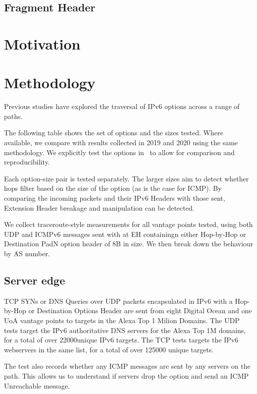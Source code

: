 \documentclass[conference]{IEEEtran}
\begin{document}
\subsection{Fragment Header}


\section{Motivation}
\label{sec:motivation}


\section{Methodology} 
\label{sec:methodology}

Previous studies have explored the traversal of IPv6 options across a range of paths.

The following table shows the set of options and the sizes tested. Where available, we
compare with results collected in 2019 and 2020 using the same methodology.
We explicitly test the options in~\cite{james} to allow for comparison and reproducibility.




Each option-size pair is tested separately.  The larger sizes aim to detect
whether hops filter based on the size of the option (as is the case for ICMP). By
comparing the incoming packets and their IPv6 Headers with those sent,
Extension Header breakage and manipulation can be detected.

We collect traceroute-style measurements for all vantage points tested, using both UDP and ICMPv6 messages sent with at EH containingn either Hop-by-Hop or Destination PadN option header of 8B in size.  We then
break down the behaviour by AS number.

\subsection{Server edge}
\label{sec:server-edge}

TCP SYNs or DNS Queries over UDP packets encapsulated in IPv6 with a Hop-by-Hop
or Destination Options Header are sent from eight Digital Ocean and one UoA vantage points to targets in the Alexa Top 1 Milion Domains.
The UDP tests target the IPv6 authoritative DNS servers for the Alexa Top 1M domains, for a total of over 22000unique IPv6 targets. The TCP tests targets the IPv6 webservers in the same list, for a total of over 125000 unique targets. 

The test also records whether any ICMP messages are sent by any servers on the path. This allows us to understand if servers drop the option and send an ICMP Unreachable message.
\end{document}
